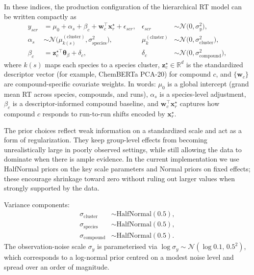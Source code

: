 \documentclass[11pt]{article}
\begin{document}
In these indices, the production configuration of the hierarchical RT model can be
written compactly as
\begin{align}
  y_{scr}
  &=
  \mu_0
  +
  \alpha_{s}
  +
  \beta_{c}
  +
  \bm{w}_{c}^{\top}\bm{x}^{\star}_{r}
  +
  \epsilon_{scr},
  &
  \epsilon_{scr} &\sim\mathcal{N}\!\bigl(0,\sigma_y^2\bigr),
  \label{eq:rt-observation}\\[0.4em]
  \alpha_{s}
  &\sim\mathcal{N}\!\bigl(\mu^{\mathrm{(cluster)}}_{k(s)},\sigma^2_{\mathrm{species}}\bigr),
  &
  \mu^{\mathrm{(cluster)}}_{k}
  &\sim\mathcal{N}\!\bigl(0,\sigma^2_{\mathrm{cluster}}\bigr),
  \label{eq:rt-species}\\[0.4em]
  \beta_{c}
  &=
  \bm{z}_{c}^{\star\top}\bm{\theta}_\beta + \delta_c,
  &
  \delta_c &\sim \mathcal{N}\!\bigl(0,\sigma^2_{\mathrm{compound}}\bigr),
  \label{eq:rt-compound}
\end{align}
where $k(s)$ maps each species to a species cluster, $\bm{z}_c^{\star}\in\mathbb{R}^d$
is the standardized descriptor vector (for example, ChemBERTa PCA-20) for compound
$c$, and $\{\bm{w}_c\}$ are compound-specific covariate weights. In words:
$\mu_0$ is a global intercept (grand mean RT across species, compounds, and runs),
$\alpha_s$ is a species-level adjustment, $\beta_c$ is a descriptor-informed compound
baseline, and $\bm{w}_c^{\top}\bm{x}^{\star}_r$ captures how compound $c$ responds to
run-to-run shifts encoded by $\bm{x}^{\star}_r$.

The prior choices reflect weak information on a standardized scale and act as a form
of regularization. They keep group-level effects from becoming unrealistically large
in poorly observed settings, while still allowing the data to dominate when there is
ample evidence. In the current implementation we use HalfNormal priors on the key
scale parameters and Normal priors on fixed effects; these encourage shrinkage toward
zero without ruling out larger values when strongly supported by the data.

Variance components:
\begin{align}
  \sigma_{\mathrm{cluster}} &\sim \mathrm{HalfNormal}(0.5), \\
  \sigma_{\mathrm{species}} &\sim \mathrm{HalfNormal}(0.5), \\
  \sigma_{\mathrm{compound}} &\sim \mathrm{HalfNormal}(0.5).
\end{align}
The observation-noise scale $\sigma_y$ is parameterised via
$\log \sigma_y\sim\mathcal{N}(\log 0.1,\,0.5^2)$, which corresponds to a log-normal
prior centred on a modest noise level and spread over an order of magnitude.
\end{document}
